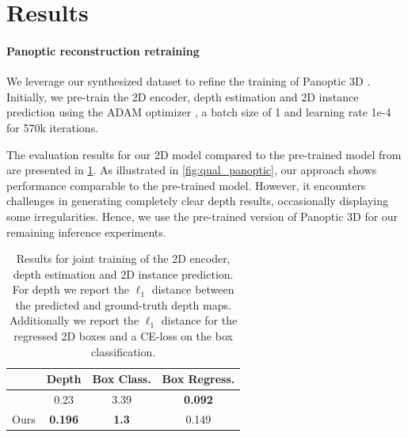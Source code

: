 \section{Results}
\label{sec:results}

\paragraph{Panoptic reconstruction retraining}

We leverage our synthesized dataset to refine the training of Panoptic 3D \citep{dahnert2021panoptic}.
Initially, we pre-train the 2D encoder, depth estimation and 2D instance prediction using the ADAM optimizer \citep{kingma2014adam}, a batch size of 1 and learning rate 1e-4 for 570k iterations.

The evaluation results for our 2D model compared to the pre-trained model from \citet{dahnert2021panoptic} are presented in \cref{tab:2dresults}.
As illustrated in \cref{fig:qual_panoptic}, our approach shows performance comparable to the pre-trained model. However, it encounters challenges in generating completely clear depth results, occasionally displaying some irregularities.
Hence, we use the pre-trained version of Panoptic 3D for our remaining inference experiments.
\begin{table}
  \centering
  \begin{tabular}{@{}lccc@{}}
    \toprule
     & Depth & Box Class. & Box Regress. \\
    \midrule
    \citet{dahnert2021panoptic} & 0.23 & 3.39 & \textbf{0.092}\\
    Ours & \textbf{0.196} & \textbf{1.3} & 0.149 \\
    \bottomrule
  \end{tabular}
  \caption{Results for joint training of the 2D encoder, depth estimation and 2D instance prediction. For depth we report the $\ell_1$ distance between the predicted and ground-truth depth maps. Additionally we report the $\ell_1$ distance for the regressed 2D boxes and a CE-loss on the box classification.  }
  \label{tab:2dresults}
\end{table}

